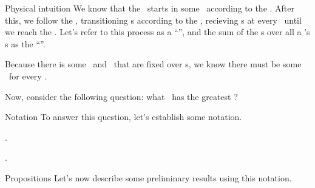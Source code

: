 \begin{part} {Physical intuition}
  We know that the \agt\ starts in some \til\ according to the \ind.
  After this, we follow the \str, 
  transitioning \til{}s according to the \trd, recieving \rwd{}s 
  at every \til\ until
  we reach the \lmt. Let's refer to this process as a ``\run'', and
  the sum of the \rwd{}s over all a \run's \til{}s
  as the ``\trwd''.

  Because there is some \ind\ and \trd\ 
  that are fixed over \run{}s, 
  we know there must be 
  some \atrwd\ for every \str.

  Now, consider the following question: 
  what \str\ has the greatest \atrwd?
\end{part}

\begin{part}{Notation}
  To answer this question, let's establish some notation.

  .

  .
  












\end{part}

\begin{part}{Propositions}
  Let's now describe some preliminary results using this notation.

\end{part}
